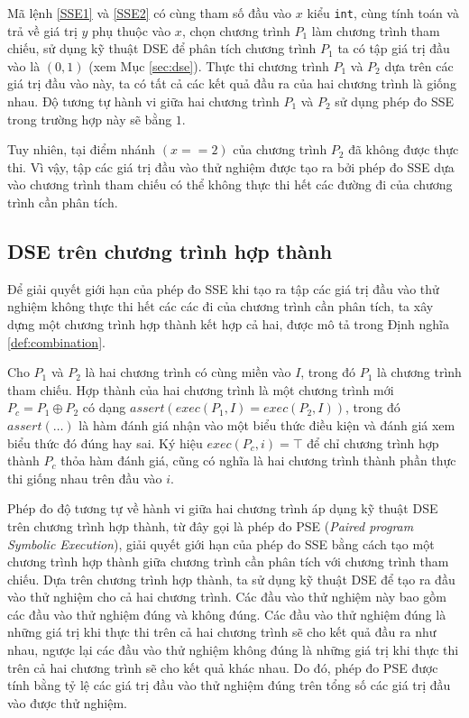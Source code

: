 Mã lệnh \ref{SSE1} và \ref{SSE2} có cùng tham số đầu vào $ x $ kiểu 
\texttt{int}, cùng tính toán và trả về giá trị $ y $ phụ thuộc vào $ x $, 
chọn chương trình $P_{1}$ làm chương trình tham chiếu, sử dụng kỹ 
thuật DSE để phân tích chương trình $P_{1}$ ta có tập giá trị đầu vào 
là $(0, 1)$ (xem Mục \ref{sec:dse}). Thực thi chương trình $P_{1}$ và 
$P_{2}$ dựa trên các giá trị đầu vào này, ta có tất cả các kết quả 
đầu ra của hai chương trình là giống nhau. Độ tương tự hành vi 
giữa hai chương trình $P_{1}$ và $P_{2}$ sử dụng phép đo SSE trong 
trường hợp này sẽ bằng $ 1 $.

Tuy nhiên, tại điểm nhánh $ (x == 2) $ của chương trình $ P_{2} $ 
đã không được thực thi. Vì vậy, tập các giá trị đầu vào thử nghiệm được tạo 
ra bởi phép đo SSE dựa vào chương trình tham chiếu có thể không 
thực thi hết các đường đi của chương trình cần phân tích.

\subsection{DSE trên chương trình hợp thành}

Để giải quyết giới hạn của phép đo SSE khi tạo ra tập các giá trị đầu
vào thử nghiệm không thực thi hết các các đi của chương trình cần phân
tích, ta xây dựng một chương trình hợp thành kết hợp cả hai, được mô
tả trong Định nghĩa \ref{def:combination}.

\begin{definition}
  \label{def:combination}
  Cho $P_1$ và $P_2$ là hai chương trình có cùng miền vào $I$, trong đó
  $P_1$ là chương trình tham chiếu. Hợp thành của hai chương trình là
  một chương trình mới $P_c = P_1 \oplus P_2$ có dạng
  $assert(exec(P_{1}, I) = exec(P_{2}, I))$, trong đó $assert(\dots)$
  là hàm đánh giá nhận vào một biểu thức điều kiện và đánh giá xem
  biểu thức đó đúng hay sai. Ký hiệu $exec(P_c,i) = \top$ để chỉ
  chương trình hợp thành $P_c$ thỏa hàm đánh giá, cũng có nghĩa là hai
  chương trình thành phần thực thi giống nhau trên đầu vào $i$.
\end{definition}

Phép đo độ tương tự về hành vi giữa hai chương trình áp dụng kỹ thuật
DSE trên chương trình hợp thành, từ đây gọi là phép đo PSE
(\emph{Paired program Symbolic Execution}), giải quyết giới hạn của
phép đo SSE bằng cách tạo một chương trình hợp thành giữa chương trình
cần phân tích với chương trình tham chiếu. Dựa trên chương trình hợp
thành, ta sử dụng kỹ thuật DSE để tạo ra đầu vào thử nghiệm cho cả hai
chương trình. Các đầu vào thử nghiệm này bao gồm các đầu vào thử
nghiệm đúng và không đúng. Các đầu vào thử nghiệm đúng là những giá
trị khi thực thi trên cả hai chương trình sẽ cho kết quả đầu ra như
nhau, ngược lại các đầu vào thử nghiệm không đúng là những giá trị khi
thực thi trên cả hai chương trình sẽ cho kết quả khác nhau. Do đó,
phép đo PSE được tính bằng tỷ lệ các giá trị đầu vào thử
nghiệm đúng trên tổng số các giá trị đầu vào được thử nghiệm.


